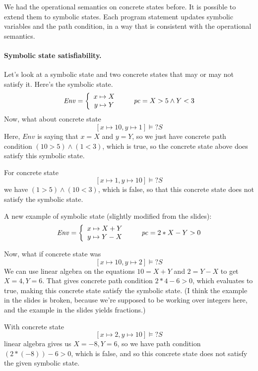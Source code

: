 \documentclass[11pt]{article}
\begin{document}
We had the operational semantics on concrete states before. It is possible to extend them to symbolic states. Each program statement updates symbolic variables and the path condition, in a way that is consistent with the operational semantics.

\paragraph{Symbolic state satisfiability.} Let's look at a symbolic state and two concrete states that may or may not satisfy it. Here's the symbolic state.
\[ \mathit{Env} = \left\{ \begin{array}{c} x \mapsto X \\ y \mapsto Y \end{array} \right. \hspace*{2em} \mathit{pc} = X > 5 \wedge Y < 3 \]
Now, what about concrete state
\[ [x \mapsto 10, y \mapsto 1] \models? S \]
Here, $\mathit{Env}$ is saying that $x = X$ and $y = Y$, so we just have concrete path condition $(10 > 5) \wedge (1 < 3)$, which is true, so the concrete state above does satisfy this symbolic state.

For concrete state 
\[ [x \mapsto 1, y \mapsto 10] \models? S \]
we have $(1 > 5) \wedge (10 < 3)$, which is false, so that this concrete state does not satisfy the symbolic state.

A new example of symbolic state (slightly modified from the slides):
\[ \mathit{Env} = \left\{ \begin{array}{c} x \mapsto X + Y \\ y \mapsto Y - X \end{array} \right. \hspace*{2em} \mathit{pc} = 2 * X - Y > 0 \]

Now, what if concrete state was
\[ [x \mapsto 10, y \mapsto 2] \models? S \]
We can use linear algebra on the equations $10 = X + Y$ and $2 = Y - X$ to get $X = 4, Y = 6$. That gives concrete path condition $2 * 4 - 6 > 0$, which evaluates to true, making this concrete
state satisfy the symbolic state. (I think the example in the slides is broken, because we're supposed to be working over integers here, and the example in the slides yields fractions.)

With concrete state
\[ [x \mapsto 2, y \mapsto 10] \models? S \]
linear algebra gives us $X = -8, Y = 6$, so we have path condition $(2 * (-8)) - 6 > 0$, which is false, and so this concrete state does not satisfy the given symbolic state.
\end{document}
